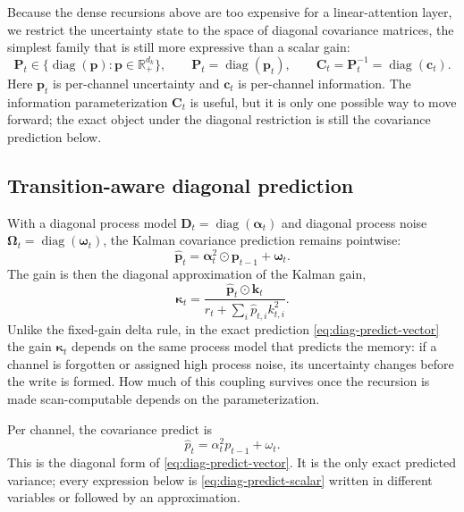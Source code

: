 \documentclass[11pt]{article}
\newcommand{\R}{\mathbb{R}}
\newcommand{\ve}[1]{\boldsymbol{#1}}
\DeclareMathOperator{\diag}{diag}
\begin{document}
Because the dense recursions above are too expensive for a linear-attention layer, we
restrict the uncertainty state to the space of diagonal covariance matrices, the simplest
family that is still more expressive than a scalar gain:
\begin{equation}
  \ve{P}_t\in\{\diag(\ve{p}):\ve{p}\in\R_+^{d_k}\},
  \qquad
  \ve{P}_t=\diag(\ve{p}_t),
  \qquad
  \ve{C}_t=\ve{P}_t^{-1}=\diag(\ve{c}_t).
  \label{eq:diag-cov-family}
\end{equation}
Here $\ve{p}_t$ is per-channel uncertainty and $\ve{c}_t$ is per-channel information.
The information parameterization $\ve{C}_t$ is useful, but it is only one possible way to
move forward; the exact object under the diagonal restriction is still the covariance
prediction below.

\subsection{Transition-aware diagonal prediction}

With a diagonal process model $\ve{D}_t=\diag(\ve{\alpha}_t)$ and diagonal process noise
$\ve{\Omega}_t=\diag(\ve{\omega}_t)$, the Kalman covariance prediction remains pointwise:
\begin{equation}
  \widehat{\ve{p}}_t
  =
  \ve{\alpha}_t^2\odot\ve{p}_{t-1}+\ve{\omega}_t .
  \tag{21}
  \label{eq:diag-predict-vector}
\end{equation}
The gain is then the diagonal approximation of the Kalman gain,
\begin{equation}
  \ve{\kappa}_t
  =
  \frac{\widehat{\ve{p}}_t\odot\ve{k}_t}
  {r_t+\sum_i\widehat{p}_{t,i}k_{t,i}^2}.
  \tag{22}
  \label{eq:diag-gain-vector}
\end{equation}
Unlike the fixed-gain delta rule, in the exact prediction \eqref{eq:diag-predict-vector} the
gain $\ve{\kappa}_t$ depends on the same process model that predicts the memory: if a channel
is forgotten or assigned high process noise, its uncertainty changes before the write is
formed. How much of this coupling survives once the recursion is made scan-computable
depends on the parameterization.

Per channel, the covariance predict is
\begin{equation}
  \boxed{\widehat{p}_t=\alpha_t^2p_{t-1}+\omega_t.}
  \tag{67}
  \label{eq:diag-predict-scalar}
\end{equation}
This is the diagonal form of \eqref{eq:diag-predict-vector}. It is the only exact predicted
variance; every expression below is \eqref{eq:diag-predict-scalar} written in different
variables or followed by an approximation.
\end{document}
